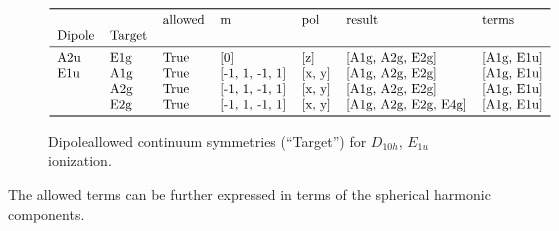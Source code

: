\documentclass[letterpaper,table,10pt,english]{jupyterBook}
\begin{document}
\begin{figure}[htbp]
\centering
\capstart
\begin{equation*}
\begin{split}\begin{tabular}{lllllll}
\toprule
    &     & allowed &               m &     pol &                result &       terms \\
Dipole & Target &         &                 &         &                       &             \\
\midrule
A2u & E1g &    True &             [0] &     [z] &       [A1g, A2g, E2g] &  [A1g, E1u] \\
E1u & A1g &    True &  [-1, 1, -1, 1] &  [x, y] &       [A1g, A2g, E2g] &  [A1g, E1u] \\
    & A2g &    True &  [-1, 1, -1, 1] &  [x, y] &       [A1g, A2g, E2g] &  [A1g, E1u] \\
    & E2g &    True &  [-1, 1, -1, 1] &  [x, y] &  [A1g, A2g, E2g, E4g] &  [A1g, E1u] \\
\bottomrule
\end{tabular}\end{split}
\end{equation*}\caption{Dipole\sphinxhyphen{}allowed continuum symmetries (“Target”) for \(D_{10h}\), \(E_{1u}\) ionization.}\label{\detokenize{part2/sym-fitting-intro_240723:fig-dipoletermsd10he1u}}\end{figure}

\sphinxAtStartPar
The allowed terms can be further expressed in terms of the spherical harmonic components.
\end{document}
